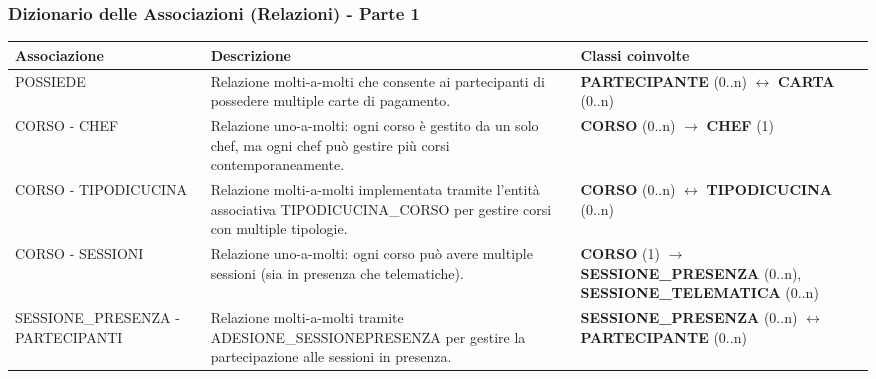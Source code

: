 \subsubsection{Dizionario delle Associazioni (Relazioni) - Parte 1}
\begin{center}
\begin{tcolorbox}[colback=white!98!gray, colframe=myblue!80!black, title=Dizionario delle Associazioni (Relazioni) - Parte 1, arc=4mm, boxrule=0.8pt, width=0.98\textwidth]
\renewcommand{\arraystretch}{1.2}
\begin{tabularx}{\textwidth}{p{3.8cm}p{4.2cm}X}
\textbf{Associazione} & \textbf{Descrizione} & \textbf{Classi coinvolte} \\
\hline
POSSIEDE & Relazione molti-a-molti che consente ai partecipanti di possedere multiple carte di pagamento. & \textbf{PARTECIPANTE} (0..n) $\leftrightarrow$ \textbf{CARTA} (0..n) \\
\hline
CORSO - CHEF & Relazione uno-a-molti: ogni corso è gestito da un solo chef, ma ogni chef può gestire più corsi contemporaneamente. & \textbf{CORSO} (0..n) $\rightarrow$ \textbf{CHEF} (1) \\
\hline
CORSO - TIPODICUCINA & Relazione molti-a-molti implementata tramite l'entità associativa TIPODICUCINA\_\-CORSO per gestire corsi con multiple tipologie. & \textbf{CORSO} (0..n) $\leftrightarrow$ \textbf{TIPODICUCINA} (0..n) \\
\hline
CORSO - SESSIONI & Relazione uno-a-molti: ogni corso può avere multiple sessioni (sia in presenza che telematiche). & \textbf{CORSO} (1) $\rightarrow$ \textbf{SESSIONE\_\-PRESENZA} (0..n), \textbf{SESSIONE\_\-TELEMATICA} (0..n) \\
\hline
SESSIONE\_\-PRESENZA - PARTECIPANTI & Relazione molti-a-molti tramite ADESIONE\_\-SESSIONEPRE\-SENZA per gestire la partecipazione alle sessioni in presenza. & \textbf{SESSIONE\_\-PRESENZA} (0..n) $\leftrightarrow$ \textbf{PARTECIPANTE} (0..n) \\
\hline
\end{tabularx}
\end{tcolorbox}
\end{center}


